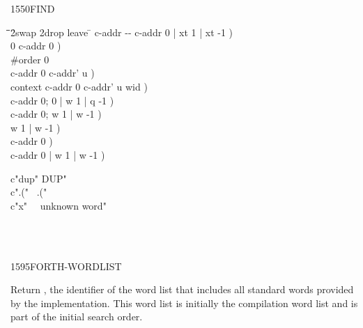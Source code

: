 \begin{worddef}{1550}{FIND}
\begin{implement}
		\begin{tabbing}
		\tab \= \tab \= \tab \= \tab \= 2swap 2drop leave \tab \= \kill
		\word{:}   c-addr -{}- c-addr 0 | xt 1 | xt -1 ) \+ \\
			0 														\>\>\>\>	 c-addr 0 ) \\
			\#order  0  \+ \\
				 							\>\>\>	 c-addr 0 c-addr' u ) \\
				  context \word{+} 		\>\>\>	 c-addr 0 c-addr' u wid ) \\
												\>\>\>	 c-addr 0; 0 | w 1 | q -1 ) \\
				 								\>\>\>	\word{p} c-addr 0; w 1 | w -1 ) \+ \\
				\>	  			\>		 w 1 | w -1 )  \\
															\>\>	 c-addr 0 ) \- \\
															\>\>\>	 c-addr 0 | w 1 | w -1 ) \- \\
		\word{;}
		\end{tabbing}
	\end{implement}

	\begin{testing} %
		\ttfamily
		\word{:} c"dup"  DUP" \word{;} \\
		\word{:} c".("~  .("~ \word{;} \\
		\word{:} c"x"~~  unknown word" \word{;}

		 \\
		 \\
	\end{testing}
\end{worddef}


\begin{worddef}{1595}{FORTH-WORDLIST}
\item {}

	Return , the identifier of the word list that includes
	all standard words provided by the implementation. This word list
	is initially the compilation word list and is part of the initial
	search order.

	\begin{testing} %
	\end{testing}
\end{worddef}


